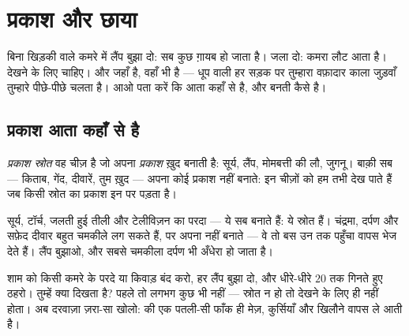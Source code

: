 \chapter{प्रकाश और छाया}\label{ch:g1:light-and-shadows}

बिना खिड़की वाले कमरे में लैंप बुझा दो: सब कुछ ग़ायब हो जाता है।
जला दो: कमरा लौट आता है। देखने के लिए  चाहिए। और जहाँ 
है, वहाँ  भी है --- धूप वाली हर सड़क पर तुम्हारा वफ़ादार काला
जुड़वाँ तुम्हारे पीछे-पीछे चलता है। आओ पता करें कि  आता कहाँ से
है, और  बनती कैसे है।

\section{प्रकाश आता कहाँ से है}

\begin{definition}[प्रकाश स्रोत]\label{def:g1:light-and-shadows:source}
\emph{प्रकाश स्रोत} वह चीज़ है जो अपना
\emph{प्रकाश} ख़ुद बनाती है: सूर्य, लैंप, मोमबत्ती की
लौ, जुगनू। बाक़ी सब --- किताब, गेंद, दीवारें, तुम ख़ुद --- अपना कोई
प्रकाश नहीं बनाते: इन चीज़ों को हम तभी देख पाते हैं जब किसी स्रोत का
प्रकाश इन पर पड़ता है।
\end{definition}

\begin{example}[स्रोत हैं या नहीं?]\label{ex:g1:light-and-shadows:sources}
सूर्य, टॉर्च, जलती हुई तीली और टेलीविज़न का परदा --- ये सब 
बनाते हैं: ये स्रोत हैं। चंद्रमा, दर्पण और सफ़ेद दीवार बहुत चमकीले लग
सकते हैं, पर अपना  नहीं बनाते --- वे तो बस उन तक पहुँचा 
वापस भेज देते हैं। लैंप बुझाओ, और सबसे चमकीला दर्पण भी अँधेरा हो जाता
है।
\end{example}

\begin{example}\label{ex:g1:light-and-shadows:darkroom}
शाम को किसी कमरे के परदे या किवाड़ बंद करो, हर लैंप बुझा दो, और
धीरे-धीरे $20$ तक गिनते हुए ठहरो। तुम्हें क्या दिखता है? पहले तो
लगभग कुछ भी नहीं --- स्रोत न हो तो देखने के लिए  ही नहीं होता।
अब दरवाज़ा ज़रा-सा खोलो:  की एक पतली-सी फाँक ही मेज़, कुर्सियाँ
और खिलौने वापस ले आती है।
\end{example}

